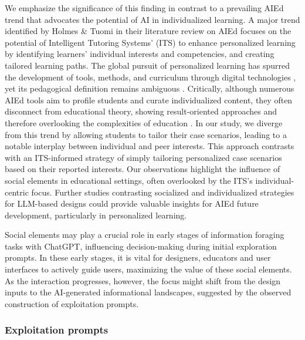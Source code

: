 \documentclass[sn-mathphys, Numbered]{sn-jnl}%
\theoremstyle{thmstyleone}%
\theoremstyle{thmstyletwo}%
\theoremstyle{thmstylethree}%
\begin{document}
We emphasize the significance of this finding in contrast to a prevailing AIEd trend that advocates the potential of AI in individualized learning. A major trend identified by Holmes \& Tuomi in their literature review on AIEd \parencite*{holmes_state_2022} focuses on the potential of Intelligent Tutoring Systems' (ITS) to enhance personalized learning by identifying learners' individual interests and competencies, and creating tailored learning paths. The global pursuit of personalized learning has spurred the development of tools, methods, and curriculum through digital technologies \parencite{brunila_precision_2023}, yet its pedagogical definition remains ambiguous \parencite{holmes_technology-enhanced_2018, biesta_why_2010}. 
Critically, although numerous AIEd tools aim to profile students and curate individualized content, they often disconnect from educational theory, showing result-oriented approaches and therefore overlooking the complexities of education \parencite{holmes_state_2022, biesta_why_2010}. In our study, we diverge from this trend by allowing students to tailor their case scenarios, leading to a notable interplay between individual and peer interests. This approach contrasts with an ITS-informed strategy of simply tailoring personalized case scenarios based on their reported interests. Our observations highlight the influence of social elements in educational settings, often overlooked by the ITS's individual-centric focus. Further studies contrasting socialized and individualized strategies for LLM-based designs could provide valuable insights for AIEd future development, particularly in personalized learning.

Social elements may play a crucial role in early stages of information foraging tasks with ChatGPT, influencing decision-making during initial exploration prompts. In these early stages, it is vital for designers, educators and user interfaces to actively guide users, maximizing the value of these social elements. As the interaction progresses, however, the focus might shift from the design inputs to the AI-generated informational landscapes, suggested by the observed construction of exploitation prompts.  

\subsubsection*{Exploitation prompts}
\end{document}
